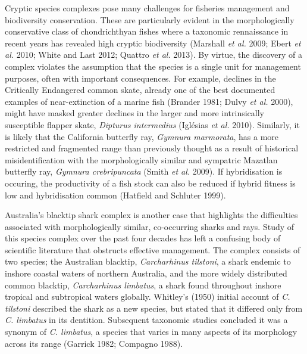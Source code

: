 \documentclass[]{article}
\begin{document}
Cryptic species complexes pose many challenges for fisheries management
and biodiversity conservation. These are particularly evident in the
morphologically conservative class of chondrichthyan fishes where a
taxonomic rennaissance in recent years has revealed high cryptic
biodiversity (Marshall \emph{et al.} 2009; Ebert \emph{et al.} 2010;
White and Last 2012; Quattro \emph{et al.} 2013). By virtue, the
discovery of a complex violates the assumption that the species is a
single unit for management purposes, often with important consequences.
For example, declines in the Critically Endangered common skate, already
one of the best documented examples of near-extinction of a marine fish
(Brander 1981; Dulvy \emph{et al.} 2000), might have masked greater
declines in the larger and more intrinsically susceptible flapper skate,
\emph{Dipturus intermedius} (Iglésias \emph{et al.} 2010). Similarly, it
is likely that the California butterfly ray, \emph{Gymnura marmorata},
has a more restricted and fragmented range than previously thought as a
result of historical misidentification with the morphologically similar
and sympatric Mazatlan butterfly ray, \emph{Gymnura crebripuncata}
(Smith \emph{et al.} 2009). If hybridisation is occuring, the
productivity of a fish stock can also be reduced if hybrid fitness is
low and hybridisation common (Hatfield and Schluter 1999).

Australia's blacktip shark complex is another case that highlights the
difficulties associated with morphologically similar, co-occurring
sharks and rays. Study of this species complex over the past four
decades has left a confusing body of scientific literature that
obstructs effective management. The complex consists of two species; the
Australian blacktip, \emph{Carcharhinus tilstoni}, a shark endemic to
inshore coastal waters of northern Australia, and the more widely
distributed common blacktip, \emph{Carcharhinus limbatus}, a shark found
throughout inshore tropical and subtropical waters globally. Whitley's
(1950) initial account of \emph{C. tilstoni} described the shark as a
new species, but stated that it differed only from \emph{C. limbatus} in
its dentition. Subsequent taxonomic studies concluded it was a synonym
of \emph{C. limbatus}, a species that varies in many aspects of its
morphology across its range (Garrick 1982; Compagno 1988).
\end{document}
